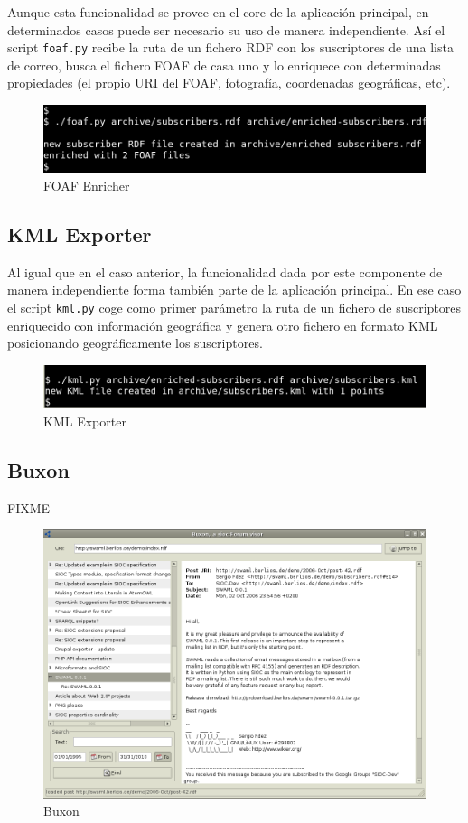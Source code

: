 Aunque esta funcionalidad se provee en el core de la aplicación principal,
en determinados casos puede ser necesario su uso de manera independiente.
Así el script \texttt{foaf.py} recibe la ruta de un fichero RDF con los
suscriptores de una lista de correo, busca el fichero FOAF de casa uno y
lo enriquece con determinadas propiedades (el propio URI del FOAF, fotografía,
coordenadas geográficas, etc).

\begin{figure}[H]
	\centering
	\includegraphics[width=15cm]{images/screenshots/foaf-enricher.png}
	\caption{FOAF Enricher}
	\label{fig:foaf-enricher}
\end{figure}

\subsection*{KML Exporter}

Al igual que en el caso anterior, la funcionalidad dada por este componente
de manera independiente forma también parte de la aplicación principal. En ese
caso el script \texttt{kml.py} coge como primer parámetro la ruta de un fichero
de suscriptores enriquecido con información geográfica y genera otro fichero
en formato KML posicionando geográficamente los suscriptores.

\begin{figure}[H]
	\centering
	\includegraphics[width=15cm]{images/screenshots/kml-exporter.png}
	\caption{KML Exporter}
	\label{fig:kml-exporter}
\end{figure}

\subsection*{Buxon}

FIXME

\begin{figure}[H]
	\centering
	\includegraphics[width=16cm]{images/screenshots/buxon.png}
	\caption{Buxon}
	\label{fig:buxon}
\end{figure}

